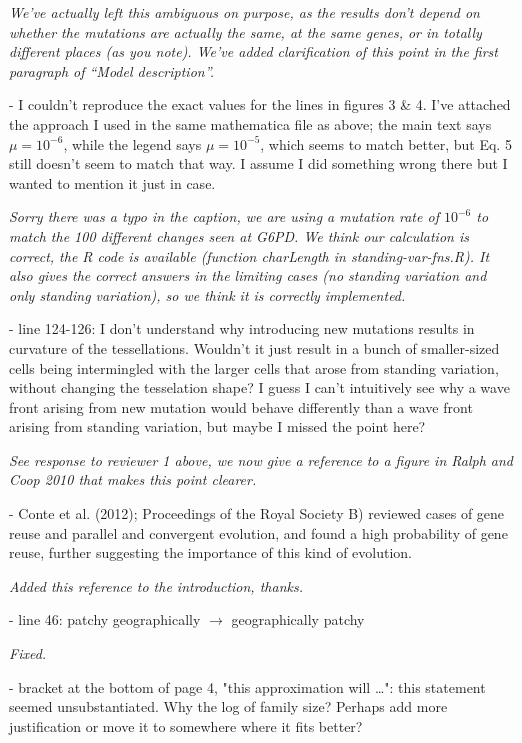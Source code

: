 \documentclass[12pt,letterpaper]{article}
\newcommand{\response}[1]{\emph{ \color{blue} #1}}
\begin{document}
\response{We've actually left this ambiguous on purpose, as the results don't depend on whether the mutations are actually the same,
at the same genes, or in totally different places (as you note).  We've added clarification of this point in the first paragraph of ``Model description''.}

- I couldn't reproduce the exact values for the lines in figures 3 \& 4. I've attached the approach I used in the same mathematica file as above; the main text says $\mu = 10^{-6}$, while the legend says $\mu=10^{-5}$, which seems to match better, but Eq. 5 still doesn't seem to match that way. I assume I did something wrong there but I wanted to mention it just in case.

\response{Sorry there was a typo in the caption, we are using a mutation rate of $10^{-6}$ to match the 100 different changes seen at G6PD. We think our calculation is correct, the R code is available (function charLength in standing-var-fns.R). It also gives the correct answers in the limiting cases (no standing variation and only standing variation), so we think it is correctly implemented.}



- line 124-126: I don't understand why introducing new mutations results in curvature of the tessellations. Wouldn't it just result in a bunch of smaller-sized cells being intermingled with the larger cells that arose from standing variation, without changing the tesselation shape? I guess I can't intuitively see why a wave front arising from new mutation would behave differently than a wave front arising from standing variation, but maybe I missed the point here?

\response{See response to reviewer 1 above, we now give a reference to a figure in Ralph and Coop 2010 that makes this point clearer.}

- Conte et al. (2012); Proceedings of the Royal Society B) reviewed cases of gene reuse and parallel and convergent evolution, and found a high probability of gene reuse, further suggesting the importance of this kind of evolution.

\response{Added this reference to the introduction, thanks.}

- line 46: patchy geographically $\rightarrow$ geographically patchy

\response{Fixed.}

- bracket at the bottom of page 4, "this approximation will \ldots": this statement seemed unsubstantiated. Why the log of family size? Perhaps add more justification or move it to somewhere where it fits better?
\end{document}
